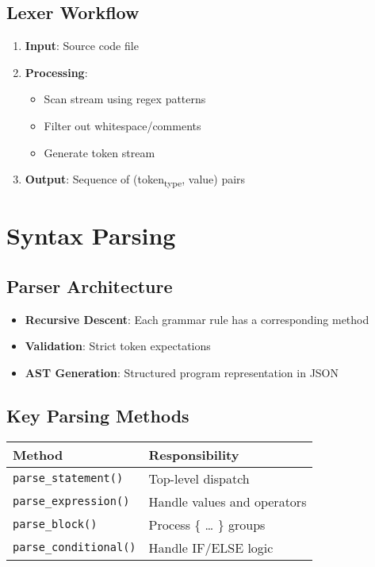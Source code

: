 \documentclass[11pt]{article}
\begin{document}
\subsection{Lexer Workflow}
\label{sec:orgb20e6dc}
\begin{enumerate}
\item \textbf{Input}: Source code file
\item \textbf{Processing}:
\begin{itemize}
\item Scan stream using regex patterns
\item Filter out whitespace/comments
\item Generate token stream
\end{itemize}
\item \textbf{Output}: Sequence of (token\textsubscript{type}, value) pairs
\end{enumerate}
\section{Syntax Parsing}
\label{sec:org0dce5e1}

\subsection{Parser Architecture}
\label{sec:orge8afe61}
\begin{itemize}
\item \textbf{Recursive Descent}: Each grammar rule has a corresponding method
\item \textbf{Validation}: Strict token expectations
\item \textbf{AST Generation}: Structured program representation in JSON
\end{itemize}
\subsection{Key Parsing Methods}
\label{sec:org8173cd0}

\begin{center}
\begin{tabular}{ll}
Method & Responsibility\\
\hline
\texttt{parse\_statement()} & Top-level dispatch\\
\texttt{parse\_expression()} & Handle values and operators\\
\texttt{parse\_block()} & Process \{ \ldots{} \} groups\\
\texttt{parse\_conditional()} & Handle IF/ELSE logic\\
\end{tabular}
\end{center}
\end{document}
